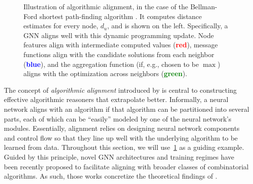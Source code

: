 \documentclass[twoside,11pt]{article}
\begin{document}
\begin{figure}

	\caption{Illustration of algorithmic alignment, in the case of the Bellman-Ford shortest path-finding algorithm \citep{Bellman1958}. It computes distance estimates for every node, $d_u$, and is shown on the left. Specifically, a GNN aligns well with this dynamic programming update. Node features align with intermediate computed values (\textcolor{red}{\textbf{red}}), message functions align with the candidate solutions from each neighbor (\textcolor{blue}{\textbf{blue}}), and the aggregation function (if, e.g., chosen to be $\max$) aligns with the optimization across neighbors (\textcolor{green}{\textbf{green}}).}
	\label{algo_align}
\end{figure}


The concept of \emph{algorithmic alignment} introduced by \cite{Xu2019a} is central to constructing effective algorithmic reasoners that extrapolate better. Informally, a neural network aligns with an algorithm if that algorithm can be partitioned into several {parts}, each of which can be ``easily'' modeled by one of the neural network's modules. Essentially, alignment relies on designing neural network components and control flow so that they line up well with the underlying algorithm to be learned from data. Throughout this section, we will use~\cref{algo_align} as a guiding example. Guided by this principle, novel GNN architectures and training regimes have been recently proposed to facilitate aligning with broader classes of combinatorial algorithms. As such, those works concretize the theoretical findings of \cite{Xu2019a}.
\end{document}

